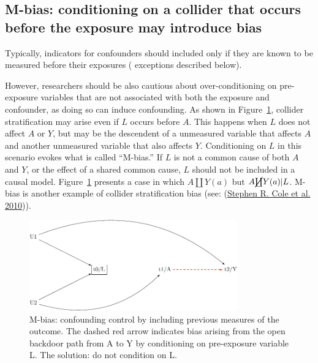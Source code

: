 \documentclass[
  singlecolumn]{report}
\begin{document}
\hypertarget{m-bias-conditioning-on-a-collider-that-occurs-before-the-exposure-may-introduce-bias}{%
\subsection{M-bias: conditioning on a collider that occurs before the
exposure may introduce
bias}\label{m-bias-conditioning-on-a-collider-that-occurs-before-the-exposure-may-introduce-bias}}

Typically, indicators for confounders should included only if they are
known to be measured before their exposures ( exceptions described
below).

However, researchers should be also cautious about over-conditioning on
pre-exposure variables that are not associated with both the exposure
and confounder, as doing so can induce confounding. As shown in
Figure~\ref{fig-m-bias}, collider stratification may arise even if \(L\)
occurs before \(A\). This happens when \(L\) does not affect \(A\) or
\(Y\), but may be the descendent of a unmeasured variable that affects
\(A\) and another unmeasured variable that also affects \(Y\).
Conditioning on \(L\) in this scenario evokes what is called ``M-bias.''
If \(L\) is not a common cause of both \(A\) and \(Y\), or the effect of
a shared common cause, \(L\) should not be included in a causal model.
Figure~\ref{fig-m-bias} presents a case in which \(A \coprod Y(a)\) but
\(A \cancel{\coprod} Y(a)| L\). M-bias is another example of collider
stratification bias (see: (\protect\hyperlink{ref-cole2010}{Stephen R.
Cole et al. 2010})).

\begin{figure}

{\centering \includegraphics[width=0.8\textwidth,height=\textheight]{causal-dags_files/figure-pdf/fig-m-bias-1.pdf}

}

\caption{\label{fig-m-bias}M-bias: confounding control by including
previous measures of the outcome. The dashed red arrow indicates bias
arising from the open backdoor path from A to Y by conditioning on
pre-exposure variable L. The solution: do not condition on L.}

\end{figure}
\end{document}
